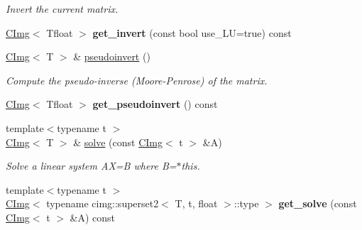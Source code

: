\begin{DoxyCompactItemize}
\begin{DoxyCompactList}\small\item\em Invert the current matrix. \item\end{DoxyCompactList}\item 
\hypertarget{structcimg__library_1_1CImg_a16fe55a07fa0f2e43ae7377a915b03d3}{
\hyperlink{structcimg__library_1_1CImg}{CImg}$<$ Tfloat $>$ {\bfseries get\_\-invert} (const bool use\_\-LU=true) const }
\label{structcimg__library_1_1CImg_a16fe55a07fa0f2e43ae7377a915b03d3}

\item 
\hypertarget{structcimg__library_1_1CImg_abff5169ef56ddce3102cfa3b6de0bd19}{
\hyperlink{structcimg__library_1_1CImg}{CImg}$<$ T $>$ \& \hyperlink{structcimg__library_1_1CImg_abff5169ef56ddce3102cfa3b6de0bd19}{pseudoinvert} ()}
\label{structcimg__library_1_1CImg_abff5169ef56ddce3102cfa3b6de0bd19}

\begin{DoxyCompactList}\small\item\em Compute the pseudo-\/inverse (Moore-\/Penrose) of the matrix. \item\end{DoxyCompactList}\item 
\hypertarget{structcimg__library_1_1CImg_aeab392972e99fa46fb49c09c5d35dbcf}{
\hyperlink{structcimg__library_1_1CImg}{CImg}$<$ Tfloat $>$ {\bfseries get\_\-pseudoinvert} () const }
\label{structcimg__library_1_1CImg_aeab392972e99fa46fb49c09c5d35dbcf}

\item 
\hypertarget{structcimg__library_1_1CImg_a595ac87408ea46f103791933e3dfd187}{
{\footnotesize template$<$typename t $>$ }\\\hyperlink{structcimg__library_1_1CImg}{CImg}$<$ T $>$ \& \hyperlink{structcimg__library_1_1CImg_a595ac87408ea46f103791933e3dfd187}{solve} (const \hyperlink{structcimg__library_1_1CImg}{CImg}$<$ t $>$ \&A)}
\label{structcimg__library_1_1CImg_a595ac87408ea46f103791933e3dfd187}

\begin{DoxyCompactList}\small\item\em Solve a linear system AX=B where B=$\ast$this. \item\end{DoxyCompactList}\item 
\hypertarget{structcimg__library_1_1CImg_aeed7c1b8ac4c972ee3fb9527f95471a0}{
{\footnotesize template$<$typename t $>$ }\\\hyperlink{structcimg__library_1_1CImg}{CImg}$<$ typename cimg::superset2$<$ T, t, float $>$::type $>$ {\bfseries get\_\-solve} (const \hyperlink{structcimg__library_1_1CImg}{CImg}$<$ t $>$ \&A) const }
\label{structcimg__library_1_1CImg_aeed7c1b8ac4c972ee3fb9527f95471a0}


\end{DoxyCompactItemize}

